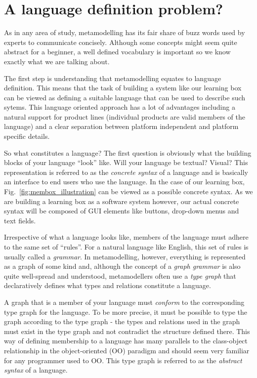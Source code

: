 
\section{A language definition problem?}

As in any area of study, metamodelling has its fair share of buzz words used by experts to communicate concisely.  Although some concepts might seem quite
abstract for a beginner, a well defined vocabulary is important so we know exactly what we are talking about.

The first step is understanding that metamodelling equates to language definition. This means that the task of building a system like our learning box can be  
viewed as defining a suitable language that can be used to describe such sytems. This language oriented approach has a lot of advantages including a natural
support for product lines (individual products are valid members of the language) and a clear separation between platform independent and platform specific details.

So what constitutes a language?  The first question is obviously what the building blocks of your language ``look'' like. Will your language be textual? Visual?
 This representation is referred to as the \emph{concrete syntax} of a language and is basically an interface to end users who use the
language. In the case of our learning box, Fig.~\ref{fig:membox_illustration} can be viewed as a possible concrete syntax. As we are building a learning box
as a software system however, our actual concrete syntax will be composed of GUI elements like buttons, drop-down menus and text fields.

Irrespective of what a language looks like, members of the language must adhere to the same set of ``rules''. For a natural language like
English, this set of rules is usually called a \emph{grammar}. In metamodelling, however, everything is represented as a graph of some kind and,
although the concept of a \emph{graph grammar} is also quite well-spread and understood, metamodellers often use a \emph{type
graph} that declaratively defines what types and relations constitute a language.

A graph that is a member of your language must \emph{conform} to the corresponding type graph for the language. To be more precise, it must be possible to
type the graph according to the type graph - the types and relations used in the graph must exist in the type graph and not contradict the structure defined there.
This way of defining membership to a language has many parallels to the class-object relationship in the object-oriented (OO) paradigm and
should seem very familiar for any programmer used to OO. This type graph is referred to as the \emph{abstract syntax} of a language.

